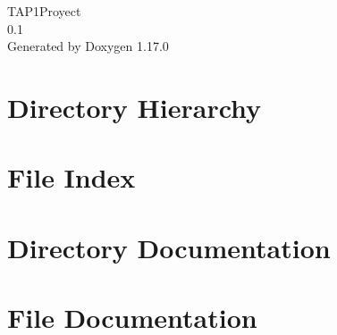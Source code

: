 \documentclass[twoside]{book}
\newcommand{\+}{\discretionary{\mbox{\scriptsize$\hookleftarrow$}}{}{}}
\newcommand{\clearemptydoublepage}{%
    \newpage{\pagestyle{empty}\cleardoublepage}%
  }
\begin{document}
  \raggedbottom
    \hypersetup{pageanchor=false,
                bookmarksnumbered=true,
                pdfencoding=unicode
               }
  \begin{titlepage}
  \vspace*{7cm}
  \begin{center}%
  {\Large TAP1\+Proyect}\\
  [1ex]\large 0.\+1 \\
  \vspace*{1cm}
  {\large Generated by Doxygen 1.17.0}\\
  \end{center}
  \end{titlepage}
  \clearemptydoublepage
  \tableofcontents
  \clearemptydoublepage
  \hypersetup{pageanchor=true}

\chapter{Directory Hierarchy}

\chapter{File Index}

\chapter{Directory Documentation}



\chapter{File Documentation}



  \backmatter
  \newpage
  \clearemptydoublepage
  \printindex
\end{document}
